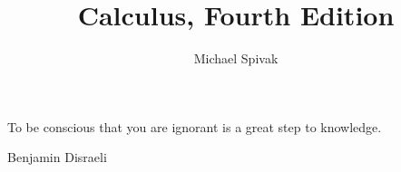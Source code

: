 \documentclass[11pt,oneside,openany]{book}
\title{Calculus, Fourth Edition}
\author{Michael Spivak}
\begin{document}
\frontmatter




\mainmatter

\epigraph{%
  To be conscious that you are ignorant is a great step to knowledge.%
}{Benjamin Disraeli}









\end{document}
